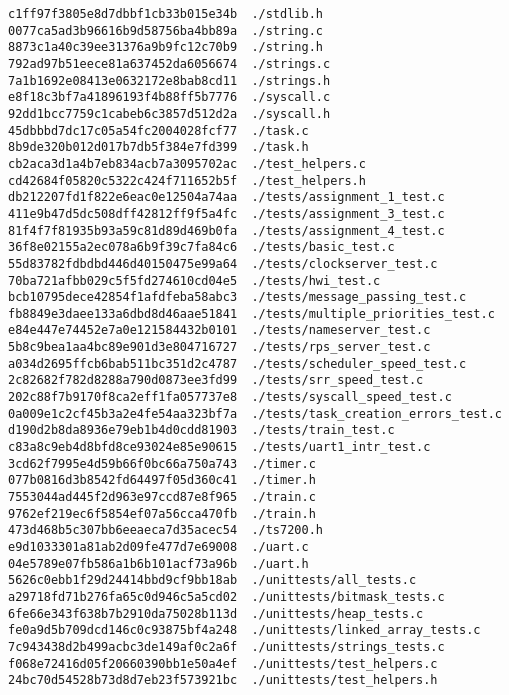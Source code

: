 \documentclass[letterpaper]{article}
\begin{document}
\begin{verbatim}
c1ff97f3805e8d7dbbf1cb33b015e34b  ./stdlib.h
0077ca5ad3b96616b9d58756ba4bb89a  ./string.c
8873c1a40c39ee31376a9b9fc12c70b9  ./string.h
792ad97b51eece81a637452da6056674  ./strings.c
7a1b1692e08413e0632172e8bab8cd11  ./strings.h
e8f18c3bf7a41896193f4b88ff5b7776  ./syscall.c
92dd1bcc7759c1cabeb6c3857d512d2a  ./syscall.h
45dbbbd7dc17c05a54fc2004028fcf77  ./task.c
8b9de320b012d017b7db5f384e7fd399  ./task.h
cb2aca3d1a4b7eb834acb7a3095702ac  ./test_helpers.c
cd42684f05820c5322c424f711652b5f  ./test_helpers.h
db212207fd1f822e6eac0e12504a74aa  ./tests/assignment_1_test.c
411e9b47d5dc508dff42812ff9f5a4fc  ./tests/assignment_3_test.c
81f4f7f81935b93a59c81d89d469b0fa  ./tests/assignment_4_test.c
36f8e02155a2ec078a6b9f39c7fa84c6  ./tests/basic_test.c
55d83782fdbdbd446d40150475e99a64  ./tests/clockserver_test.c
70ba721afbb029c5f5fd274610cd04e5  ./tests/hwi_test.c
bcb10795dece42854f1afdfeba58abc3  ./tests/message_passing_test.c
fb8849e3daee133a6dbd8d46aae51841  ./tests/multiple_priorities_test.c
e84e447e74452e7a0e121584432b0101  ./tests/nameserver_test.c
5b8c9bea1aa4bc89e901d3e804716727  ./tests/rps_server_test.c
a034d2695ffcb6bab511bc351d2c4787  ./tests/scheduler_speed_test.c
2c82682f782d8288a790d0873ee3fd99  ./tests/srr_speed_test.c
202c88f7b9170f8ca2eff1fa057737e8  ./tests/syscall_speed_test.c
0a009e1c2cf45b3a2e4fe54aa323bf7a  ./tests/task_creation_errors_test.c
d190d2b8da8936e79eb1b4d0cdd81903  ./tests/train_test.c
c83a8c9eb4d8bfd8ce93024e85e90615  ./tests/uart1_intr_test.c
3cd62f7995e4d59b66f0bc66a750a743  ./timer.c
077b0816d3b8542fd64497f05d360c41  ./timer.h
7553044ad445f2d963e97ccd87e8f965  ./train.c
9762ef219ec6f5854ef07a56cca470fb  ./train.h
473d468b5c307bb6eeaeca7d35acec54  ./ts7200.h
e9d1033301a81ab2d09fe477d7e69008  ./uart.c
04e5789e07fb586a1b6b101acf73a96b  ./uart.h
5626c0ebb1f29d24414bbd9cf9bb18ab  ./unittests/all_tests.c
a29718fd71b276fa65c0d946c5a5cd02  ./unittests/bitmask_tests.c
6fe66e343f638b7b2910da75028b113d  ./unittests/heap_tests.c
fe0a9d5b709dcd146c0c93875bf4a248  ./unittests/linked_array_tests.c
7c943438d2b499acbc3de149af0c2a6f  ./unittests/strings_tests.c
f068e72416d05f20660390bb1e50a4ef  ./unittests/test_helpers.c
24bc70d54528b73d8d7eb23f573921bc  ./unittests/test_helpers.h
\end{verbatim}
\end{document}
